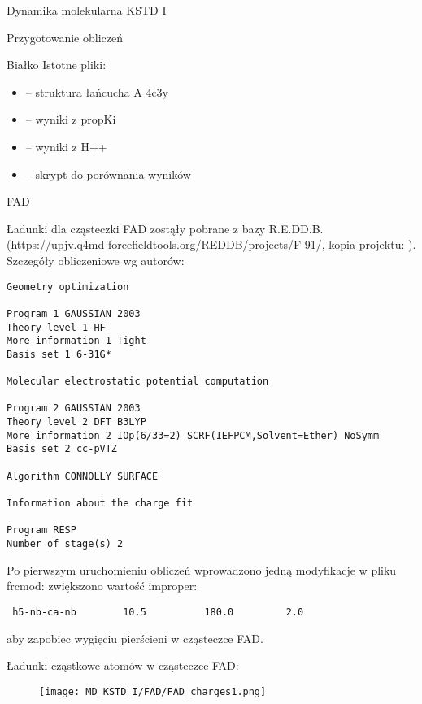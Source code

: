 \begin{section}{Dynamika molekularna KSTD I}
\begin{subsection}{Przygotowanie obliczeń}
\begin{subsubsection}{Białko}
 Istotne pliki:
 
\begin{itemize}
 \item {} -- struktura łańcucha A 4c3y
 \item {} -- wyniki z propKi
 \item {} -- wyniki z H++
 \item {} -- skrypt do porównania wyników
\end{itemize}

\end{subsubsection}

\begin{subsubsection}{FAD}

Ładunki dla cząsteczki FAD zostąły pobrane z bazy R.E.DD.B. (https://upjv.q4md-forcefieldtools.org/REDDB/projects/F-91/, kopia projektu:  ).
Szczegóły obliczeniowe wg autorów:

\begin{verbatim}
Geometry optimization

Program 1 GAUSSIAN 2003
Theory level 1 HF
More information 1 Tight
Basis set 1 6-31G*

Molecular electrostatic potential computation

Program 2 GAUSSIAN 2003
Theory level 2 DFT B3LYP
More information 2 IOp(6/33=2) SCRF(IEFPCM,Solvent=Ether) NoSymm
Basis set 2 cc-pVTZ

Algorithm CONNOLLY SURFACE

Information about the charge fit

Program RESP
Number of stage(s) 2
\end{verbatim}

Po pierwszym uruchomieniu obliczeń wprowadzono jedną modyfikacje w pliku frcmod: zwiększono wartość improper:\\
\begin{verbatim}
 h5-nb-ca-nb        10.5          180.0         2.0
\end{verbatim}
aby zapobiec wygięciu pierścieni w cząsteczce FAD.

Ładunki cząstkowe atomów w cząsteczce FAD:
 \begin{figure}[H]
  \texttt{[image: MD\_KSTD\_I/FAD/FAD\_charges1.png]}
\end{figure}


\end{subsubsection}
\end{subsection}
\end{section}
